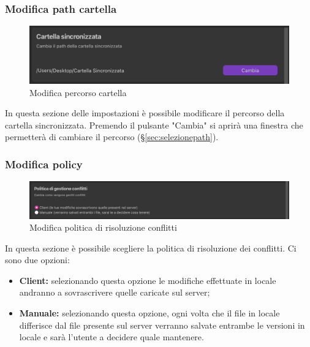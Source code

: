 \subsubsection{Modifica path cartella}
\label{sec:cartella}
\begin{figure}[H]
    \centering
    \includegraphics[scale = 1]{components/img/ImpCartella.png}
    \caption{Modifica percorso cartella}
    \label{fig:cartella}
\end{figure}
In questa sezione delle impostazioni è possibile modificare il percorso della cartella sincronizzata. Premendo il pulsante "Cambia" si aprirà una finestra che permetterà di cambiare il percorso (\S{}\ref{sec:selezionepath}).

\subsubsection{Modifica policy}
\label{sec:policy}
\begin{figure}[H]
    \centering
    \includegraphics[scale = 0.4]{components/img/ImpPolicy.png}
    \caption{Modifica politica di risoluzione conflitti}
    \label{fig:policy}
\end{figure}
In questa sezione è possibile scegliere la politica di risoluzione dei conflitti. Ci sono due opzioni:
\begin{itemize}
\item\textbf{Client:} selezionando questa opzione le modifiche effettuate in locale andranno a sovrascrivere quelle caricate sul server;\
\item\textbf{Manuale:} selezionando questa opzione, ogni volta che il file in locale differisce dal file presente sul server verranno salvate entrambe le versioni in locale e sarà l'utente a decidere quale mantenere.\
\end{itemize}

